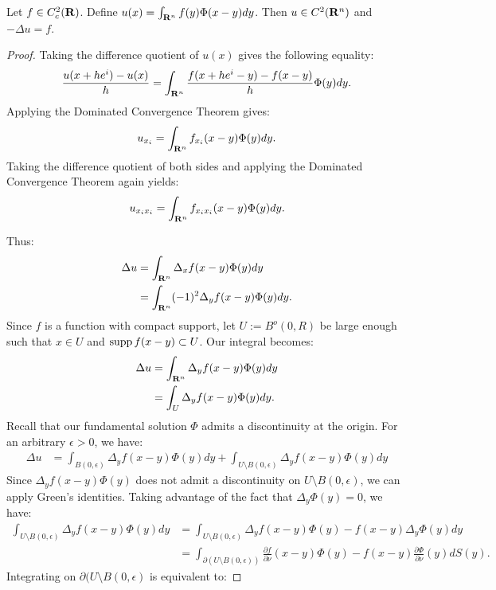 \begin{theorem}\label{thm:laplace-poisson}
	Let $f \in C^2_c(\mathbf{R})$. Define $u(x) = \int_{\mathbf{R}^n}^{} f(y)\Phi(x-y)dy$. Then $u \in C^2(\mathbf{R}^n)$ and $-\Delta u = f$.
\end{theorem}
	\begin{proof}
		Taking the difference quotient of $u(x)$ gives the following equality:
		\[
			\frac{u(x+h e^i) - u(x)}{h} = \int_{\mathbf{R}^n}^{} \frac{f(x+h e^i - y) - f(x-y)}{h}\Phi(y)dy.
		\]
		Applying the Dominated Convergence Theorem gives:
		\[
			u_{x_i} = \int_{\mathbf{R}^n}^{} f_{x_i}(x-y) \Phi(y)dy.
		\] 
		Taking the difference quotient of both sides and applying the Dominated Convergence Theorem again yields:
		\[
			u_{x_i x_i} = \int_{\mathbf{R}^n}^{} f_{x_i x_i}(x-y) \Phi (y) dy.
		\] 
		
		Thus:
		\begin{align*}
			\Delta u 
			& = \int_{\mathbf{R}^n}^{} \Delta_x f(x-y) \Phi(y)dy \\
			& = \int_{\mathbf{R}^n}^{} (-1)^2 \Delta_y f(x-y) \Phi(y)dy.
		\end{align*}
		Since $f$ is a function with compact support, let $U := B^o(0,R)$ be large enough such that $x \in U$ and $\operatorname{supp} f(x-y) \subset U$. Our integral becomes:
		\begin{align*}
			\Delta u
			&= \int_{\mathbf{R}^n}^{} \Delta_y f(x-y) \Phi(y) dy \\
			&= \int_{U}^{} \Delta_y f(x-y) \Phi(y) dy.
		\end{align*}
		Recall that our fundamental solution $\Phi$ admits a discontinuity at the origin. For an arbitrary $\epsilon > 0$, we have:
		\begin{align*}
			\Delta u
			&= \int_{B(0,\epsilon)}^{} \Delta_y f(x-y) \Phi(y) dy + \int_{U \setminus B(0,\epsilon)}^{} \Delta_y f(x-y) \Phi(y) dy 
		\end{align*}
		Since $\Delta_y f(x-y) \Phi(y)$ does not admit a discontinuity on $U \setminus B(0,\epsilon)$, we can apply Green's identities. Taking advantage of the fact that $\Delta_y \Phi(y) = 0$, we have:
		\begin{align*}
			\int_{U \setminus B(0,\epsilon)}^{} \Delta_y f(x-y) \Phi(y) dy
			&= \int_{U \setminus B(0,\epsilon)}^{} \Delta_y f(x-y) \Phi(y) - f(x-y) \Delta_y \Phi(y)dy\\
			&= \int_{\partial (U \setminus B(0,\epsilon))}^{} \frac{\partial f}{\partial \nu}(x-y) \Phi(y) - f(x-y) \frac{\partial \Phi}{\partial \nu}(y) dS(y).
		\end{align*}
		Integrating on $\partial (U \setminus B(0,\epsilon)$ is equivalent to:

\end{proof}

